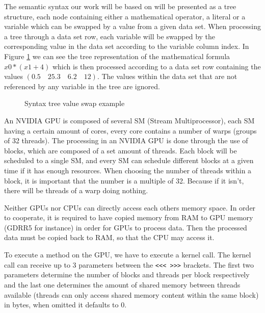 \documentclass[runningheads]{llncs}
\begin{document}
The semantic syntax our work will be based on will be presented as a tree structure, each node containing either a mathematical operator, a literal or a variable which can be swapped by a value from a given data set.
When processing a tree through a data set row, each variable will be swapped by the corresponding value in the data set according to the variable column index. In Figure \ref{syntree} we can see the tree representation of the mathematical formula $x0 * (x1+4)$ which is then processed according to a data set row containing the values $(0.5\quad 25.3\quad 6.2\quad 12)$. The values within the data set that are not referenced by any variable in the tree are ignored.
\begin{figure}

\hfil
{}
\hfil
\caption{Syntax tree value swap example}
\label{syntree}
\end{figure}


An NVIDIA GPU is composed of several SM (Stream Multiprocessor), each SM having a certain amount of cores, every core contains a number of warps (groups of 32 threads).
The processing in an NVIDIA GPU is done through the use of blocks, which are composed of a set amount of threads. Each block will be scheduled to a single SM, and every SM can schedule different blocks at a given time if it has enough resources. When choosing the number of threads within a block, it is important that the number is a multiple of 32. Because if it isn't, there will be threads of a warp doing nothing.

Neither GPUs nor CPUs can directly access each others memory space. In order to cooperate, it is required to have copied memory from RAM to GPU memory (GDRR5 for instance) in order for GPUs to process data. Then the processed data must be copied back to RAM, so that the CPU may access it.

To execute a method on the GPU, we have to execute a kernel call. The kernel call can receive up to 3 parameters between the \texttt{<<< >>>} brackets. The first two parameters determine the number of blocks and threads per block respectively and the last one determines the amount of shared memory between threads available (threads can only access shared memory content within the same block) in bytes, when omitted it defaults to 0.
\end{document}
